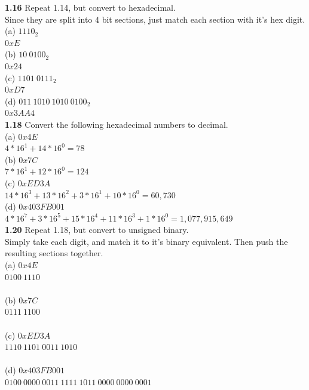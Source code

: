 \documentclass[12pt,a4paper]{report}
\begin{document}
\begin{normalsize}
\textbf{1.16} Repeat 1.14, but convert to hexadecimal. \\
Since they are split into 4 bit sections, just match each section with it's hex digit.\\
(a) $ 1110_{2} $ \\
$ 0xE $ \\
(b) $ 10\:0100_{2} $ \\
$ 0x24 $ \\
(c) $ 1101\:0111_{2} $ \\
$ 0xD7 $ \\
(d) $ 011\:1010\:1010\:0100_{2} $ \\
$ 0x3AA4 $ \\

\textbf{1.18} Convert the following hexadecimal numbers to decimal. \\
(a) $ 0x4E $ \\
$ 4*16^{1} + 14*16^{0} = 78 $ \\
(b) $ 0x7C $ \\
$ 7*16^{1} + 12*16^{0} = 124 $ \\
(c) $ 0xED3A $ \\
$ 14*16^{3} + 13*16^{2} + 3*16^{1} + 10*16^{0} = 60,730 $ \\
(d) $ 0x403FB001 $ \\
$ 4*16^{7} + 3*16^{5} + 15*16^{4} + 11*16^{3} + 1*16^{0} = 1,077,915,649 $ \\

\textbf{1.20} Repeat 1.18, but convert to unsigned binary. \\
Simply take each digit, and match it to it's binary equivalent. Then push the resulting sections together. \\
(a) $ 0x4E $ \\
$ 0100\: 1110 $ \\ \\
(b) $ 0x7C $ \\
$ 0111\: 1100 $ \\ \\
(c) $ 0xED3A $ \\
$ 1110\: 1101\: 0011\: 1010 $ \\ \\
(d) $ 0x403FB001 $ \\
$ 0100\: 0000\: 0011\: 1111\: 1011\: 0000\: 0000\: 0001 $ \\ \\


\end{normalsize}
\end{document}
